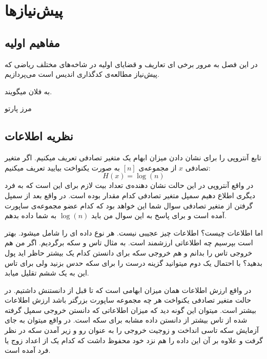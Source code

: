 \chapter{پیش‌نیازها}
\label{chapter:preliminaries}
\section{مفاهیم اولیه}

در این فصل به مرور برخی ای تعاریف و قضایای اولیه در شاخه‌های مختلف ریاضی که پیش‌نیاز مطالعه‌ی کدگذاری اندیس است می‌پردازیم.


\begin{definition}[
	کد
	\lr{mds}
	]
	\label{def:mds}
\end{definition}

\begin{definition}
	\label{def:Pareto}
    به فلان میگویند.

    مرز پارتو
    \label{def:Pareto-boundary}
\end{definition}

\section{
    ‌نظریه اطلاعات
}

تابع آنتروپی را برای نشان دادن میزان ابهام یک متغیر تصادفی تعریف میکنیم. اگر متغیر تصادفی
$x$
از مجموعه‌ی
$[n]$
به صورت یکنواخت بیایید تعریف میکنیم:
$$H(x) = \log(n)$$
در واقع آنتروپی در این حالت نشان دهنده‌ی تعداد بیت لازم برای این است که به فرد دیگری اطلاع دهیم سمپل متغیر تصادفی کدام مقدار بوده است. در واقع بعد از سمپل گرفتن از متغیر تصادفی سوال شما این خواهد بود که کدام عضو مجموعه‌ی ساپورت آمده است و برای پاسخ به این سوال من باید
$\log(n)$
به شما داده بدهم.

اما اطلاعات چیست؟ اطلاعات چیز عجیبی نیست. هر نوع داده ای را شامل میشود. بهتر است بپرسیم چه اطلاعاتی ارزشمند است. به مثال تاس و سکه برگردیم. اگر من هم خروجی تاس را بدانم و هم خروجی سکه برای دانستن کدام یک بیشتر حاظر اید پول بدهید؟ با احتمال یک دوم میتوانید گزینه درست را برای سکه حدس بزنید ولی برای تاس این به یک ششم تقلیل میابد.

در واقع ارزش اطلاعات همان میزان ابهامی است که تا قبل از دانستنش داشتیم. در حالت متغیر تصادفی یکنواخت هر چه مجموعه ساپورت بزرگتر باشد ارزش اطلاعات بیشتر است. میتوان این گونه دید که میزان اطلاعاتی که دانستن خروجی سمپل گرفته شده از تاس بیشتر از دانستن داده مشابه برای سکه است. در واقع میتوان به جای آزمایش سکه تاسی انداخت و زوجیت خروجی را به عنوان رو و زیر آمدن سکه در نظر گرفت و علاوه بر آن این داده را هم نزد خود محفوظ داشت که کدام یک از اعداد زوج یا فرد آمده است.

